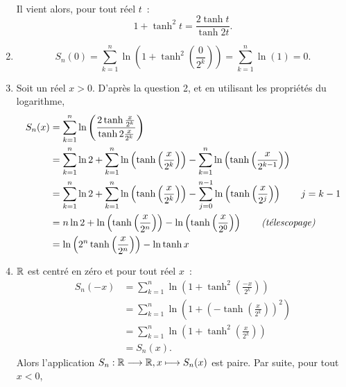 \begin{exercice}
\begin{enumerate}
\begin{align*}
            \end{align*}
            Il vient alors, pour tout réel \(t\)~:
            \begin{equation*}
                1+\tanh^2 t = \frac{2\tanh t}{\tanh 2t}.
            \end{equation*}
        \item
            \begin{equation*}
                S_n(0) = \sum_{k=1}^{n} \ln\left(1+\tanh^2\left(\frac{0}{2^k}\right)\right) = \sum_{k=1}^{n}\ln(1) = 0.
            \end{equation*}
        \item Soit un réel \(x>0\). D'après la question 2, et en utilisant les propriétés du logarithme,
            \begin{align*}
                S_n(x)  &= \sum_{k=1}^{n} \ln\left(\frac{2\tanh \frac{x}{2^k}}{\tanh 2\frac{x}{2^k}}\right) \\
                        &= \sum_{k=1}^{n} \ln 2 + \sum_{k=1}^{n} \ln\left(\tanh\left(\frac{x}{2^k}\right)\right) - \sum_{k=1}^{n} \ln\left(\tanh\left(\frac{x}{2^{k-1}}\right)\right) \\
                        &=  \sum_{k=1}^{n} \ln 2 + \sum_{k=1}^{n} \ln\left(\tanh\left(\frac{x}{2^k}\right)\right) - \sum_{j=0}^{n-1} \ln\left(\tanh\left(\frac{x}{2^{j}}\right)\right) \qquad j=k-1 \\
                        &= n\ln 2 + \ln\left(\tanh\left(\frac{x}{2^n}\right)\right) - \ln\left(\tanh\left(\frac{x}{2^0}\right)\right) \qquad \text{\emph{(télescopage)}}\\
                        &= \ln\left(2^n\tanh\left(\frac{x}{2^n}\right)\right) - \ln\tanh x
            \end{align*}
        \item \(\mathbb{R}\) est centré en zéro et pour tout réel \(x\)~:
            \begin{align*}
                S_n(-x) &= \sum_{k=1}^{n}\ln\left(1+\tanh^2\left(\frac{-x}{2^k}\right)\right) \\
                        &= \sum_{k=1}^{n}\ln\left(1+\left(-\tanh\left(\frac{x}{2^k}\right)\right)^2\right) \\
                        &= \sum_{k=1}^{n}\ln\left(1+\tanh^2\left(\frac{x}{2^k}\right)\right) \\
                        &= S_n(x).
            \end{align*}
            Alors l'application \(S_n:\mathbb{R} \longrightarrow \mathbb{R}, x \longmapsto S_n(x)\) est paire. Par suite, pour tout \(x < 0\),

\end{enumerate}
\end{exercice}
